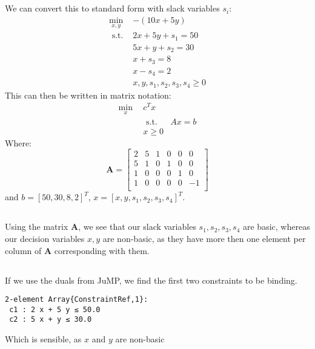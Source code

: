 \documentclass[english]{article}
\begin{document}
\subsection{}
We can convert this to standard form with slack variables $s_i$:
$$
\begin{aligned}
\min _{x, y} & -(10 x+5 y) \\
\text { s.t. } & 2 x+5 y+s_1=50 \\
& 5 x+y+s_2=30 \\
& x + s_3=8\\
& x - s_4 =2 \\
& x, y, s_1, s_2, s_3, s_4 \geq 0
\end{aligned}
$$
This can then be written in matrix notation: 
$$
\begin{aligned}
\min _{x}\ \ & c^Tx \\
& \text { s.t. } & Ax = b \\
& x \geq 0
\end{aligned}
$$
Where:
$$
\mathbf{A} = \begin{bmatrix}
2 & 5 & 1 & 0 & 0 & 0 \\
5 & 1 & 0 & 1 & 0 & 0 \\
1 & 0 & 0 & 0 & 1 & 0 \\
1 & 0 & 0 & 0 & 0 & -1 \\
\end{bmatrix}
$$
and $b = [50, 30, 8, 2]^T$, $x = [x, y, s_1, s_2, s_3, s_4]^T$.


\subsection{}
Using the matrix $\mathbf{A}$, we see that our slack variables $s_1, s_2,s_3, s_4$ are basic, whereas our decision variables $x, y$ are non-basic, as they have more then one element per column of $\mathbf{A}$ corresponding with them. 

\subsection{}
If we use the duals from JuMP, we find the first two constraints to be binding. 
\begin{verbatim}
2-element Array{ConstraintRef,1}:
 c1 : 2 x + 5 y ≤ 50.0
 c2 : 5 x + y ≤ 30.0
\end{verbatim}
Which is sensible, as $x$ and $y$ are non-basic
\end{document}
